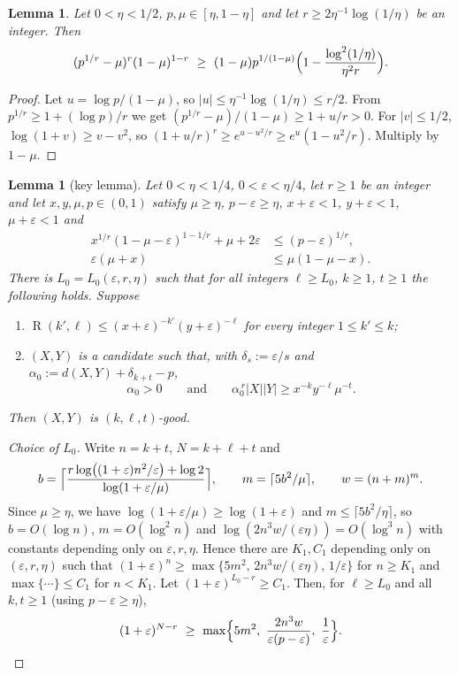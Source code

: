 \documentclass[11pt]{article}
\newtheorem{lemma}[theorem]{Lemma}
\theoremstyle{definition}
\newcommand{\eps}{\varepsilon}
\DeclareMathOperator{\Ram}{R}
\begin{document}
\begin{lemma}\label{lem:limit}
Let $0<\eta<1/2$, $p,\mu\in[\eta,1-\eta]$ and let $r\ge2\eta^{-1}\log(1/\eta)$ be an integer.  Then
\[
(p^{1/r}-\mu)^r(1-\mu)^{1-r}\ \ge\ (1-\mu)p^{1/(1-\mu)}\Bigl(1-\frac{\log^2(1/\eta)}{\eta^2r}\Bigr).
\]
\end{lemma}
\begin{proof}
Let $u=\log p/(1-\mu)$, so $|u|\le\eta^{-1}\log(1/\eta)\le r/2$.  From $p^{1/r}\ge1+(\log p)/r$ we get $(p^{1/r}-\mu)/(1-\mu)\ge1+u/r>0$.  For $|v|\le1/2$, $\log(1+v)\ge v-v^2$, so $(1+u/r)^r\ge e^{u-u^2/r}\ge e^u(1-u^2/r)$.  Multiply by $1-\mu$.
\end{proof}

\begin{lemma}[key lemma]\label{lem:key}
Let $0<\eta<1/4$, $0<\eps<\eta/4$, let $r\ge1$ be an integer and let $x,y,\mu,p\in(0,1)$ satisfy $\mu\ge\eta$, $p-\eps\ge\eta$, $x+\eps<1$, $y+\eps<1$, $\mu+\eps<1$ and
\begin{align}
x^{1/r}(1-\mu-\eps)^{1-1/r}+\mu+2\eps&\le(p-\eps)^{1/r},\label{eq:K1}\\
\eps(\mu+x)&\le\mu(1-\mu-x).\label{eq:K2}
\end{align}
There is $L_0=L_0(\eps,r,\eta)$ such that for all integers $\ell\ge L_0$, $k\ge1$, $t\ge1$ the following holds.  Suppose
\begin{enumerate}[label=\textup{(H\arabic*)},leftmargin=3em]
\item $\Ram(k',\ell)\le(x+\eps)^{-k'}(y+\eps)^{-\ell}$ for every integer $1\le k'\le k$;
\item $(X,Y)$ is a candidate such that, with $\delta_s:=\eps/s$ and $\alpha_0:=d(X,Y)+\delta_{k+t}-p$,
\begin{equation}\label{eq:potential}
\alpha_0>0\qquad\text{and}\qquad\alpha_0^{\,r}|X||Y|\ge x^{-k}y^{-\ell}\mu^{-t}.
\end{equation}
\end{enumerate}
Then $(X,Y)$ is $(k,\ell,t)$-good.
\end{lemma}

\begin{proof}[Choice of $L_0$]
Write $n=k+t$, $N=k+\ell+t$ and
\begin{equation}\label{eq:bm}
b=\Bigl\lceil\frac{r\log\bigl((1+\eps)n^2/\eps\bigr)+\log2}{\log(1+\eps/\mu)}\Bigr\rceil,\qquad m=\lceil5b^2/\mu\rceil,\qquad w=(n+m)^m .
\end{equation}
Since $\mu\ge\eta$, we have $\log(1+\eps/\mu)\ge\log(1+\eps)$ and $m\le\lceil5b^2/\eta\rceil$, so $b=O(\log n)$, $m=O(\log^2n)$ and $\log(2n^3w/(\eps\eta))=O(\log^3n)$ with constants depending only on $\eps,r,\eta$.  Hence there are $K_1,C_1$ depending only on $(\eps,r,\eta)$ such that $(1+\eps)^n\ge\max\{5m^2,\,2n^3w/(\eps\eta),\,1/\eps\}$ for $n\ge K_1$ and $\max\{\cdots\}\le C_1$ for $n<K_1$.  Let $(1+\eps)^{L_0-r}\ge C_1$.  Then, for $\ell\ge L_0$ and all $k,t\ge1$ (using $p-\eps\ge\eta$),
\begin{equation}\label{eq:R}
(1+\eps)^{N-r}\ \ge\ \max\Bigl\{5m^2,\ \frac{2n^3w}{\eps(p-\eps)},\ \frac1\eps\Bigr\}. \qedhere
\end{equation}
\end{proof}
\end{document}
